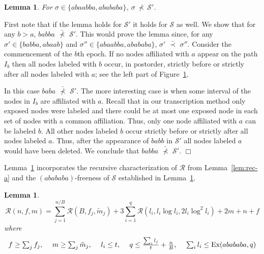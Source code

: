 \documentclass{article}
\newenvironment{proof}{\noindent {\bf Proof:}}{\hfill$\Box$}
\newtheorem{lemma}[theorem]{Lemma}
\newcommand{\hcm}[1][1]{\hspace*{#1 cm}}
\newcommand{\Ex}{\mbox{\rm Ex}}
\newcommand{\mdown}{\tilde{m}}
\newcommand{\Seq}{\mathscr{S}}
\newcommand{\Rec}{\mathscr{R}}
\newcommand{\subseq}{\,\prec\,}
\newcommand{\nsubseq}{\,\nprec\,}
\newcommand{\subseqe}{\,\bar{\subseq}\,}
\newcommand{\nsubseqe}{\,\bar{\nsubseq}\,}
\begin{document}
\begin{lemma}\label{lem:abaabba}
For $\sigma\in\{abaabba,abababa\}$, $\sigma \nsubseq \Seq'$.
\end{lemma}

\begin{proof}
First note that if the lemma holds for $\Seq'$ it holds for $\Seq$ as well.
We show that for any $b>a$, $babba\nsubseqe \Seq'$. 
This would prove the lemma since, for any $\sigma' \in \{babba,abaab\}$ and $\sigma'' \in \{abaabba, abababa\}$, 
$\sigma'\subseqe \sigma''$.
Consider the commencement of the $b$th epoch.  If no nodes affiliated with $a$ appear on the path $I_b$
then all nodes labeled with $b$ occur, in postorder, strictly before or strictly after all nodes labeled with $a$; see the left part of 
Figure~\ref{fig:abaabba}.  
\begin{figure}[h!]
\begin{center}
\end{center}
\caption{\label{fig:abaabba}}
\end{figure}
In this case
$baba \nsubseqe \Seq'$.  The more interesting case is when some interval of the nodes in $I_b$ are affiliated with $a$.
Recall that in our transcription method only exposed nodes were labeled and there could be at most one exposed node
in each set of nodes with a common affiliation.
Thus, only one node affiliated with $a$ can be labeled $b$.   All other nodes labeled
$b$ occur strictly before or strictly after all nodes labeled $a$.  Thus, after the appearance of $babb$ in $\Seq'$ all nodes
labeled $a$ would have been deleted.  We conclude that $babba \nsubseqe \Seq'$.
\end{proof}



Lemma~\ref{lem:rec-b} incorporates the recursive characterization of $\Rec$ from Lemma~\ref{lem:rec-a}
and the $(abababa)$-freeness of $\Seq$ established in Lemma~\ref{lem:abaabba}.

\begin{lemma}\label{lem:rec-b}
\[
\Rec(n,f,m) = \sum_{j=1}^{n/B} \Rec(B,f_j,\mdown_j) + 3\sum_{i=1}^{q} \Rec(l_i, l_i\log l_i, 2l_i\log^2 l_i) + 2m + n + f
\]
where 
\[
\begin{array}{l@{\hcm[.5]}l@{\hcm[.5]}l@{\hcm[.5]}l@{\hcm[.5]}l}
f \ge \sum_j f_j, &
m \ge \sum_j \mdown_j, &
l_i \le t, &
q \le \frac{\sum_i l_j}{t} + \frac{n}{B}, &
\sum_i l_i \le \Ex(abababa, q)
\end{array}
\]
\end{lemma}
\end{document}
